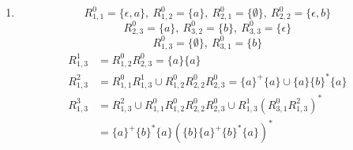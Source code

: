 \documentclass[a4paper]{scrartcl}
\newcommand{\aufgabe}[1]{\item[\textbf{#1}]}
\begin{document}
\begin{enumerate}
\begin{enumerate}[1.]
\end{enumerate}


\aufgabe{3.4}
$$R^0_{1,1}=\{\epsilon,a\},\ R^0_{1,2}=\{a\},\ R^0_{2,1}=\{\emptyset\},\ R^0_{2,2}=\{\epsilon, b\}$$
$$R^0_{2,3}=\{a\},\ R^0_{3,2}=\{b\},\ R^0_{3,3}=\{\epsilon\}$$
$$R^0_{1,3}=\{\emptyset\},\ R^0_{3,1}=\{b\}$$
\begin{align}
 R^1_{1,3} &= R^0_{1,2} R^0_{2,3} = \{a\}\{a\}\\
 R^2_{1,3} &= R^0_{1,1}R^1_{1,3} \cup R^0_{1,2}R^0_{2,2}R^0_{2,3} = \{a\}^+\{a\}\cup \{a\}\{b\}^*\{a\}\\
 R^3_{1,3} &= R^2_{1,3} \cup R^0_{1,1} R^0_{1,2}R^0_{2,2}R^0_{2,3} \cup R^1_{1,3} (R^0_{3,1} R^2_{1,3})^*\\
		   &= \{a\}^+\{b\}^*\{a\} \left(\{b\}\{a\}^+\{b\}^*\{a\}\right)^*
\end{align}

\end{enumerate}
\end{document}
